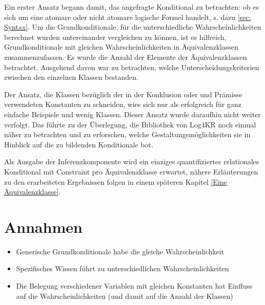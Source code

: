 \documentclass[a4paper, 11pt]{book}
\begin{document}
Ein erster Ansatz begann damit, das angefragte Konditional zu betrachten: ob es sich um eine atomare oder nicht atomare logische Formel handelt, s. dazu \ref{sec: Syntax}.
Um die Grundkonditionale, für die unterschiedliche Wahrscheinlichkeiten berechnet wurden untereinander vergleichen zu können, ist es hilfreich, Grundkonditionale mit gleichen Wahrscheinlichkeiten in Äquivalenzklassen  zusammenzufassen.
Es wurde die Anzahl der Elemente der Äquivalenzklassen  betrachtet. Ausgehend davon war zu betrachten, welche Unterscheidungskriterien zwischen den einzelnen Klassen bestanden.

Der Ansatz, die Klassen bezüglich der in der Konklusion oder und Prämisse verwendeten Konstanten zu schneiden, wies sich nur als erfolgreich für ganz einfache Beispiele und wenig Klassen. Dieser Ansatz wurde daraufhin nicht weiter verfolgt. Das führte zu der Überlegung, die Bibliothek von Log4KR noch einmal näher zu betrachten und zu erforschen, welche Gestaltungsmöglichkeiten sie in Hinblick auf die zu bildenden Konditionale bot.

Als Ausgabe der Inferenzkomponente wird ein einziges quantifiziertes relationales Konditional mit Constraint pro Äquivalenzklasse erwartet, nähere Erläuterungen zu den erarbeiteten Ergebnissen folgen in einem späteren Kapitel \ref{Eine Äquivalenzklasse}.


\section{Annahmen}

\begin{itemize}
	\item Generische Grundkonditionale habe die gleiche Wahrscheinlichkeit
	\item Spezifisches Wissen führt zu unterschiedlichen Wahrscheinlichkeiten
	\item Die Belegung verschiedener Variablen mit gleichen Konstanten hat Einfluss auf die Wahrscheinlichkeiten (und damit auf die Anzahl der Klassen)
	
\end{itemize}


\fontsize{11pt}{13.2pt}\selectfont

\setlongtables
\end{document}
